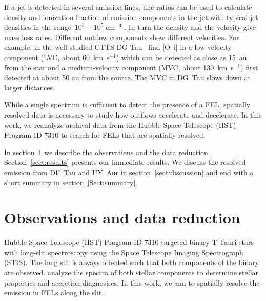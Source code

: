 \documentclass[twocolumn,trackchanges]{aastex63}
\begin{document}
If a
jet is detected in several emission lines, line ratios can be used to
calculate density and ionization fraction of emission components in the
jet with typical jet densities in the range~$10^3-10^5\;\mathrm{cm}^{-3}$
\citep[e.g.][]{1993ApJ...410L..31S,1999A&A...342..717B,2000A&A...356L..41L,2013A&A...550L...1S}. In turn
the density and the velocity give mass loss rates. Different outflow
components show different velocities. For example, in the well-studied
CTTS DG Tau~\citet{2013A&A...550L...1S} find [O~{\sc i}] in a low-velocity
component (LVC, about 60~km~s$^{-1}$) which can be detected as
close as 15~au from the star and a medium-velocity component (MVC, about
130~km~s$^{-1}$) first detected at about 50 au from the source. The MVC in DG~Tau
slows down at larger distances. 

While a single spectrum is sufficient to
detect the presence of a FEL, spatially resolved data is necessary to study
how outflows accelerate and decelerate. In this work, we reanalyze
archival data from the Hubble Space Telescope (HST) Program ID 7310 to
search for FELs that are spatially resolved.

In section~\ref{sect:obs} we describe the observations and the data reduction. Section~\ref{sect:results} presents our immediate results. We discuss the resolved emission from DF~Tau and UY~Aur in section~\ref{sect:discussion} and end with a short summary in section~\ref{Sect:summary}.

\section{Observations and data reduction}
\label{sect:obs}



Hubble Space Telescope (HST) Program ID 7310 targeted binary T Tauri
stars with long-slit spectroscopy using the Space Telescope Imaging
Spectrograph (STIS). The long slit is always oriented such that both
components of the binary are observed. \citet{2003ApJ...583..334H} analyze the
spectra of both stellar components to determine stellar properties and
accretion diagnostics. In this work, we aim to spatially resolve the
emission in FELs along the slit.
\end{document}
